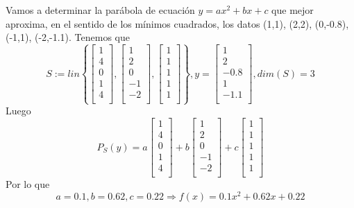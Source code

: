 \begin{ejemplo}
Vamos a determinar la parábola de ecuación $y=ax^2 + bx + c$ que mejor aproxima, en el sentido de los mínimos cuadrados, los datos (1,1), (2,2), (0,-0.8), (-1,1), (-2,-1.1). Tenemos que
\[ S:= lin \left\lbrace \begin{bmatrix}
1 \\
4 \\
0 \\
1 \\
4 \\
\end{bmatrix}
, \begin{bmatrix}
1 \\
2 \\
0 \\
-1 \\
-2 \\
\end{bmatrix}
, \begin{bmatrix}
1 \\
1 \\
1 \\
1 \\
1 \\
\end{bmatrix}
\right\rbrace
, y = \begin{bmatrix}
1 \\
2 \\
-0.8 \\
1 \\
-1.1 \\
\end{bmatrix}, dim (S) = 3 \]
Luego
\[ P_S(y) = a \begin{bmatrix}
1 \\
4 \\
0 \\
1 \\
4 \\
\end{bmatrix}
+ b \begin{bmatrix}
1 \\
2 \\
0 \\
-1 \\
-2 \\
\end{bmatrix}
+ c \begin{bmatrix}
1 \\
1 \\
1 \\
1 \\
1 \\
\end{bmatrix}
\]
Por lo que
\[ a = 0.1, b = 0.62, c = 0.22 \Rightarrow f(x) = 0.1x^2 + 0.62x +0.22 \]
\end{ejemplo}

